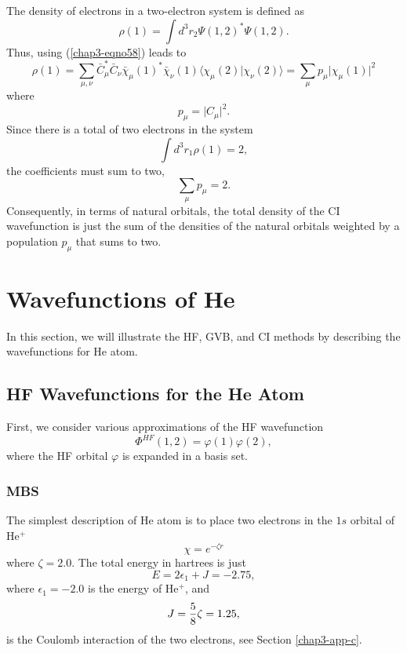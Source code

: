 The density of electrons in a two-electron system is defined as
\begin{equation}
\rho(1) = \int d^3 r_2 \Psi(1,2)^* \Psi(1,2) .
\end{equation}
Thus, using (\ref{chap3-eqno58}) leads to
\begin{equation}
\rho(1) = \sum_{\mu , \nu} {\bar C}^*_{\mu} {\bar C}_{\nu} {\bar 
\chi}_{\mu} (1)^* {\bar \chi}_{\nu}(1) \langle \chi_{\mu}(2) \vert 
\chi_{\nu} (2) \rangle = \sum_{\mu} p_{\mu} \vert \chi_{\mu} (1) \vert^2
\end{equation}
where
\begin{equation}
p_{\mu} = \vert C_{\mu} \vert^2 .
\end{equation}
Since there is a total of two electrons in the system
\begin{equation}
\int d^3 r_1 \rho(1) = 2 ,
\end{equation}
the coefficients must sum to two,
\begin{equation}
\sum_{\mu} p_{\mu} = 2 .
\end{equation}
Consequently, in terms of natural orbitals, the total density of the
CI wavefunction is just the sum of the densities of the natural
orbitals weighted by a population $p_{\mu}$ that sums to two.

\section{Wavefunctions of He}

In this section, we will illustrate the HF, GVB, and CI methods by
describing the wavefunctions for He atom.

\subsection{HF Wavefunctions for the He Atom}

First, we consider various approximations of the HF
wavefunction
\begin{equation}
\Phi^{HF} (1,2) = \varphi(1) \varphi(2) ,
\end{equation}
where the HF orbital $\varphi$ is expanded in a basis set.

\subsubsection{MBS}

The simplest description of He atom is to place two electrons in the 
$1s$ orbital of He$^+$
\begin{equation}
\chi = e^{- \zeta r}
\end{equation}
where $\zeta = 2.0$.  The total energy in hartrees is just
\begin{equation}
E = 2 \epsilon_1 + J = - 2.75 ,
\end{equation}
where $\epsilon_1 = -2.0$ is the energy of He$^+$, and
\begin{equation}
J = {5 \over 8} \zeta = 1.25 ,
\end{equation}
is the Coulomb interaction of the two electrons, see Section
\ref{chap3-app-c}.

